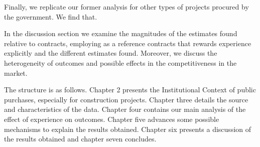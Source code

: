 Finally, we replicate our former analysis for other types of projects procured by the government. We find that.

In the discussion section we examine the magnitudes of the estimates found  relative to contracts, employing as a reference contracts that rewards experience explicitly and the different estimates found. Moreover, we discuss the heterogeneity of outcomes and possible effects in the competitiveness in the market.

The structure is as follows. Chapter 2 presents the Institutional Context of public purchases, especially for construction projects. Chapter three details the source and characteristics of the data. Chapter four contains our main analysis of the effect of experience on outcomes. Chapter five advances some possible mechanisms to explain the results obtained. Chapter six presents a discussion of the results obtained and chapter seven concludes.
